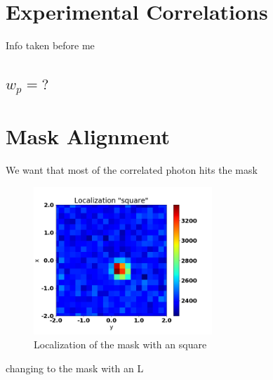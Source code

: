 \section{Experimental Correlations }

Info taken before me 
\subsection{$w_p = ?$}

\section{Mask Alignment}
We want that most of the correlated photon hits the mask 

\begin{figure}[h!]
\centering
\includegraphics[width=0.6\textwidth]{Figures/localizationSq.png} 
\caption{Localization of the mask with an square}
\label{fig:localizationSq}
\end{figure}

changing to the mask with an L

